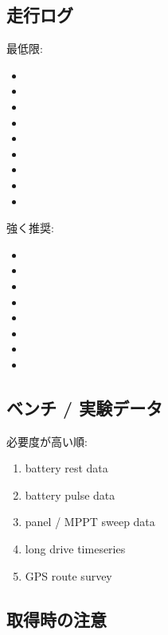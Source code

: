 \documentclass[a4paper,11pt]{article}
\begin{document}
\subsection{走行ログ}

最低限:

\begin{itemize}
  \item {}
  \item {}
  \item {}
  \item {}
  \item {}
  \item {}
  \item {}
  \item {}
  \item {}
\end{itemize}

強く推奨:

\begin{itemize}
  \item {}
  \item {}
  \item {}
  \item {}
  \item {}
  \item {}
  \item {}
  \item {}
\end{itemize}

\subsection{ベンチ / 実験データ}

必要度が高い順:

\begin{enumerate}
  \item battery rest data
  \item battery pulse data
  \item panel / MPPT sweep data
  \item long drive timeseries
  \item GPS route survey
\end{enumerate}

\subsection{取得時の注意}
\end{document}
